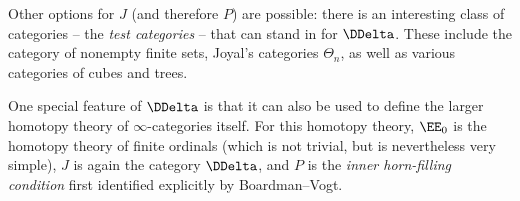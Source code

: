 Other options for $J$ (and therefore $P$) are possible:
there is an interesting class of categories -- the \emph{test categories} -- that can stand in for $\DDelta$. 
These include the category of nonempty finite sets, Joyal's categories $\Theta_n$, as well as various categories of cubes and trees.

One special feature of $\DDelta$ is that it can also be used to define the larger homotopy theory of $\infty$-categories itself.
For this homotopy theory, $\EE_0$ is the homotopy theory of finite ordinals (which is not trivial, but is nevertheless very simple),
$J$ is again the category $\DDelta$,
and $P$ is the \emph{inner horn-filling condition} first identified explicitly by Boardman--Vogt.






